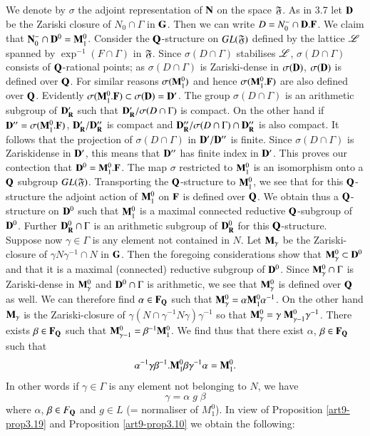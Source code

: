 \setcounter{subsection}{19}
\subsection{}\label{art9-subsec3.20}
We denote by $\sigma$ the adjoint representation of $\mathbf{N}$ on the space $\mathfrak{F}$. As in 3.7 let $\mathbf{D}$ be the Zariski closure of $N_0 \cap \Gamma$ in $\mathbf{G}$. Then we can write $D = N^-_0 \cap \mathbf{D}.\mathbf{F}$. We claim that $\mathbf{N}^-_0 \cap \mathbf{D}^0 = \mathbf{M}^0_1$. Consider the $\mathbf{Q}$-structure on $GL (\mathfrak{F})$ defined by the lattice $\mathscr{L}$ spanned by $\exp^{-1} (F \cap \Gamma)$ in $\mathfrak{F}$. Since $\sigma (D \cap \Gamma)$ stabilises $\mathscr{L}$, $\sigma (D \cap \Gamma)$ consists of $\mathbf{Q}$-rational points; as $\sigma (D \cap \Gamma)$ is Zariski-dense in $\sigma(\mathbf{D})$, $\sigma(\mathbf{D})$ is defined over $\mathbf{Q}$. For similar reasons $\sigma (\mathbf{M}^0_1)$ and hence $\sigma (\mathbf{M}^0_1. \mathbf{F})$ are also defined over $\mathbf{Q}$. Evidently $\sigma (\mathbf{M}^0_1. \mathbf{F}) \subset \sigma (\mathbf{D}) = \mathbf{D}'$. The group $\sigma (D \cap \Gamma)$ is an arithmetic subgroup of $\mathbf{D}'_{\mathbf{R}}$ such that $\mathbf{D}'_{\mathbf{R}}/ \sigma (D \cap \Gamma)$ is compact. On the other hand if $\mathbf{D}'' = \sigma (\mathbf{M}^0_1. \mathbf{F})$, $\mathbf{D}'_{\mathbf{R}}/ \mathbf{D}''_{\mathbf{R}}$ is compact and $\mathbf{D}''_{\mathbf{R}}/\sigma (D \cap \Gamma) \cap \mathbf{D}''_{\mathbf{R}}$ is also compact. It follows that the projection of $\sigma (D \cap \Gamma)$ in $\mathbf{D}'/\mathbf{D}''$ is finite. Since $\sigma (D \cap \Gamma)$ is Zariskidense in $\mathbf{D}'$, this means that $\mathbf{D}''$ has finite index in $\mathbf{D}'$. This proves our contection that $\mathbf{D}^0= \mathbf{M}^0_1.\mathbf{F}$. The map $\sigma$ restricted to $\mathbf{M}^0_1$ is an isomorphism onto a $\mathbf{Q}$ subgroup $GL(\mathfrak{F})$. Transporting the $\mathbf{Q}$-structure to $\mathbf{M}^0_1$, we see that for this $\mathbf{Q}$-structure the adjoint action of $\mathbf{M}^0_1$ on $\mathbf{F}$ is defined over $\mathbf{Q}$. We obtain thus a $\mathbf{Q}$-structure on $\mathbf{D}^0$ such that $\mathbf{M}^0_1$ is a maximal connected reductive $\mathbf{Q}$-subgroup of $\mathbf{D}^0$. Further $\mathbf{D}^0_{\mathbf{R}} \cap \Gamma$ is an arithmetic subgroup of $\mathbf{D}^0_{\mathbf{R}}$ for this $\mathbf{Q}$-structure. Suppose now $\gamma \in \Gamma$ is any element not contained in $N$. Let $\mathbf{M}_\gamma$ be the Zariski-closure of $\gamma N \gamma^{-1} \cap N$ in $\mathbf{G}$. Then the foregoing considerations show that $\mathbf{M}^0_\gamma \subset \mathbf{D}^0$ and that it is a maximal (connected) reductive subgroup of $\mathbf{D}^0$. Since $\mathbf{M}^0_\gamma \cap \Gamma$ is Zariski-dense in $\mathbf{M}^0_\gamma$ and $\mathbf{D}^0 \cap \Gamma$ is arithmetic, we see that $\mathbf{M}^0_\gamma$ is defined over $\mathbf{Q}$ as well. We can therefore find $\alpha \in \mathbf{F}_{\mathbf{Q}}$ such that $\mathbf{M}^0_\gamma = \alpha \mathbf{M}^0_1 \alpha^{-1}$. On the other hand $\mathbf{M}_\gamma$ is the Zariski-closure of $\gamma (N \cap \gamma^{-1} N \gamma)\gamma^{-1}$ so that $\mathbf{M}^0_\gamma =\gamma \; \mathbf{M}^0_{\gamma -1} \gamma^{-1}$. There exists $\beta \in \mathbf{F}_{\mathbf{Q}}$ such that $\mathbf{M}^0_{\gamma -1 } = \beta^{-1} \mathbf{M}^0_1$. We find thus that there exist $\alpha$, $\beta \in \mathbf{F}_{\mathbf{Q}}$ such that 
$$
\alpha^{-1} \gamma \beta^{-1}.\mathbf{M}^0_1 \beta\gamma^{-1} \alpha = \mathbf{M}^0_1.
$$\pageoriginale 
In other words if $\gamma \in \Gamma$ is any element not belonging to $N$, we have
$$
\gamma = \alpha \;g \;\beta
$$
where $\alpha$, $\beta \in F_{\mathbf{Q}}$ and $g \in L $ (= normaliser of $M^0_1$). In view of Proposition \ref{art9-prop3.19} and Proposition \ref{art9-prop3.10} we obtain the following:

